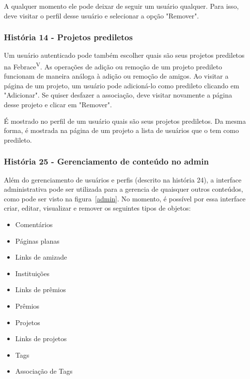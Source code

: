       A qualquer momento ele pode deixar de seguir um usuário qualquer. Para isso, deve visitar o perfil desse usuário e selecionar a opção "Remover".

    \subsubsection{História 14 - Projetos prediletos}
      Um usuário autenticado pode também escolher quais são seus projetos prediletos na Febrace\textsuperscript{V}. As operações de adição ou remoção de um projeto predileto funcionam de maneira análoga à adição ou remoção de amigos. Ao visitar a página de um projeto, um usuário pode adicioná-lo como predileto clicando em "Adicionar". Se quiser desfazer a associação, deve visitar novamente a página desse projeto e clicar em "Remover".

      É mostrado no perfil de um usuário quais são seus projetos prediletos. Da mesma forma, é mostrada na página de um projeto a lista de usuários que o tem como predileto.

    \subsubsection{História 25 - Gerenciamento de conteúdo no admin}
      Além do gerenciamento de usuários e perfis (descrito na história 24), a interface administrativa pode ser utilizada para a gerencia de quaisquer outros conteúdos, como pode ser visto na figura~\ref{admin}. No momento, é possível por essa interface criar, editar, visualizar e remover os seguintes tipos de objetos:

      \begin{multicols}{3}
      \begin{itemize}
        \item{Comentários}
        \item{Páginas planas}
        \item{Links de amizade}
        \item{Instituições}
        \item{Links de prêmios}
        \item{Prêmios}
        \item{Projetos}
        \item{Links de projetos}
        \item{Tags}
        \item{Associação de Tags}
      \end{itemize}
      \end{multicols}

